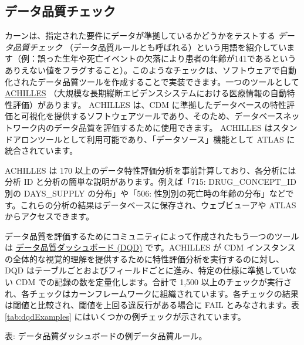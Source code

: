 \documentclass[
  11pt]{book}
\theoremstyle{definition}
\theoremstyle{definition}
\theoremstyle{definition}
\theoremstyle{definition}
\theoremstyle{remark}
\begin{document}
 

\subsection{データ品質チェック}\label{ux30c7ux30fcux30bfux54c1ux8ceaux30c1ux30a7ux30c3ux30af}

 

カーンは、指定された要件にデータが準拠しているかどうかをテストする \emph{データ品質チェック} （データ品質ルールとも呼ばれる）という用語を紹介しています（例：誤った生年や死亡イベントの欠落により患者の年齢が141であるというありえない値をフラグすること）。このようなチェックは、ソフトウェアで自動化されたデータ品質ツールを作成することで実装できます。一つのツールとして \href{https://github.com/OHDSI/Achilles}{ACHILLES} （大規模な長期縦断エビデンスシステムにおける医療情報の自動特性評価）があります。 \citep{huser_methods_2018} ACHILLES は、CDM に準拠したデータベースの特性評価と可視化を提供するソフトウェアツールであり、そのため、データベースネットワーク内のデータ品質を評価するために使用できます。 \citep{huser_multisite_2016} ACHILLES はスタンドアロンツールとして利用可能であり、「データソース」機能として ATLAS に統合されています。  

ACHILLES は 170 以上のデータ特性評価分析を事前計算しており、各分析には分析 ID と分析の簡単な説明があります。例えば「715: DRUG\_CONCEPT\_ID 別の DAYS\_SUPPLY の分布」や「506: 性別別の死亡時の年齢の分布」などです。これらの分析の結果はデータベースに保存され、ウェブビューアや ATLAS からアクセスできます。


データ品質を評価するためにコミュニティによって作成されたもう一つのツールは \href{https://github.com/OHDSI/DataQualityDashboard}{データ品質ダッシュボード (DQD)} です。ACHILLES が CDM インスタンスの全体的な視覚的理解を提供するために特性評価分析を実行するのに対し、DQD はテーブルごとおよびフィールドごとに進み、特定の仕様に準拠していない CDM での記録の数を定量化します。合計で 1,500 以上のチェックが実行され、各チェックはカーンフレームワークに組織されています。各チェックの結果は閾値と比較され、閾値を上回る違反行がある場合に FAIL とみなされます。表 \ref{tab:dqdExamples} にはいくつかの例チェックが示されています。

表: \label{tab:dqdExamples} データ品質ダッシュボードの例データ品質ルール。
\end{document}
